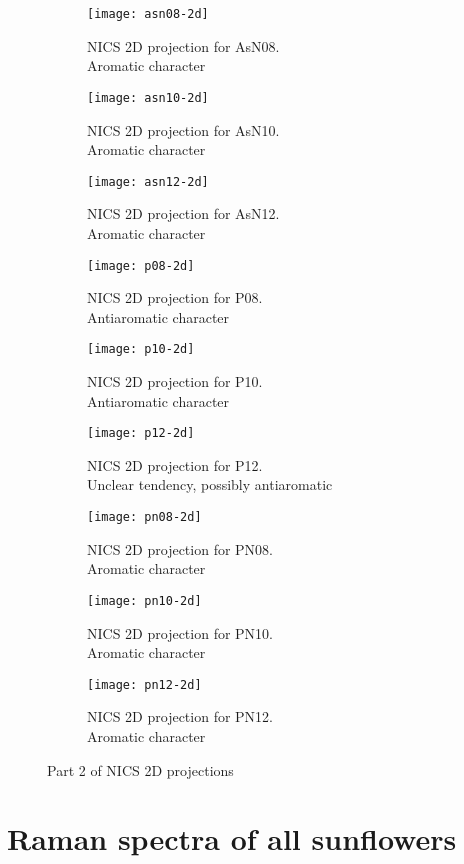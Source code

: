 \begin{figure*}[h]
\centering
\begin{subfigure}{5.5cm}\centering\texttt{[image: asn08-2d]}\caption{NICS 2D projection for AsN08.\\Aromatic character}\end{subfigure}%
\begin{subfigure}{5.5cm}\centering\texttt{[image: asn10-2d]}\caption{NICS 2D projection for AsN10.\\Aromatic character}\end{subfigure}%
\begin{subfigure}{5.5cm}\centering\texttt{[image: asn12-2d]}\caption{NICS 2D projection for AsN12.\\Aromatic character}\end{subfigure}
\begin{subfigure}{5.5cm}\centering\texttt{[image: p08-2d]}\caption{NICS 2D projection for P08.\\Antiaromatic character}\end{subfigure}%
\begin{subfigure}{5.5cm}\centering\texttt{[image: p10-2d]}\caption{NICS 2D projection for P10.\\Antiaromatic character}\end{subfigure}%
\begin{subfigure}{5.5cm}\centering\texttt{[image: p12-2d]}\caption{NICS 2D projection for P12.\\Unclear tendency, possibly antiaromatic}\end{subfigure}
\begin{subfigure}{5.5cm}\centering\texttt{[image: pn08-2d]}\caption{NICS 2D projection for PN08.\\Aromatic character}\end{subfigure}%
\begin{subfigure}{5.5cm}\centering\texttt{[image: pn10-2d]}\caption{NICS 2D projection for PN10.\\Aromatic character}\end{subfigure}%
\begin{subfigure}{5.5cm}\centering\texttt{[image: pn12-2d]}\caption{NICS 2D projection for PN12.\\Aromatic character}\end{subfigure}
\caption[Part 2 of NICS 2D projections]{Part 2 of NICS 2D projections}
\end{figure*}


\newpage
\section{Raman spectra of all sunflowers}


